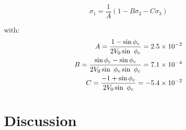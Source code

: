\begin{equation}\label{eq5:pmc_sig2sig1}
    \sigma_1 = \frac{1}{A}\left(1-B\sigma_2-C\sigma_3\right)
\end{equation}

with:
\begin{align}
    A = \frac{1-\sin \phi_c}{2V_0\sin \phi_c} = \num{2.5d-2}\\
    B = \frac{\sin \phi_c - \sin \phi_e}{2V_0 \sin \phi_e \sin \phi_c} = \num{7.1d-4} \\
    C = \frac{-1+\sin \phi_e}{2V_0\sin \phi_e} = -\num{5.4d-2} \\
\end{align}

\section{Discussion}